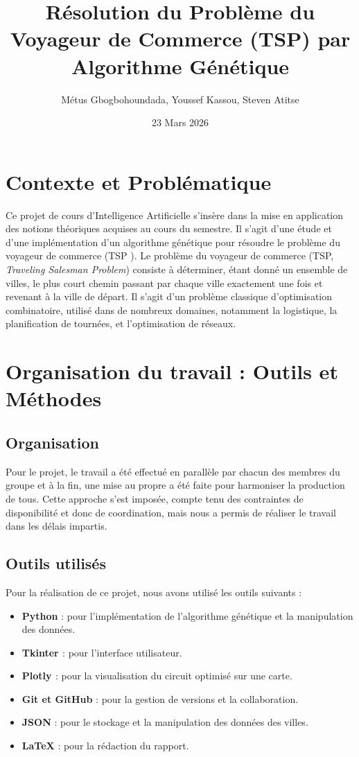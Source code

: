 \documentclass[a4paper,12pt]{article}
\title{Résolution du Problème du Voyageur de Commerce (TSP) par Algorithme Génétique}
\author{Métus Gbogbohoundada, Youssef Kassou, Steven Atitse}
\date{23 Mars 2026}
\begin{document}
\maketitle

\section{Contexte et Problématique}
Ce projet de cours d'Intelligence Artificielle s'insère dans la mise en application des notions théoriques acquises au cours du semestre. Il s'agit d'une étude et d'une implémentation d'un algorithme génétique pour résoudre le problème du voyageur de commerce (TSP \cite{wikipedia_tsp}).
Le problème du voyageur de commerce (TSP, \emph{Traveling Salesman Problem}) consiste à déterminer, étant donné un ensemble de villes, le plus court chemin passant par chaque ville exactement une fois et revenant à la ville de départ. Il s'agit d'un problème classique d'optimisation combinatoire, utilisé dans de nombreux domaines, notamment la logistique, la planification de tournées, et l'optimisation de réseaux.

\section{Organisation du travail : Outils et Méthodes}
\subsection{Organisation}
Pour le projet, le travail a été effectué en parallèle par chacun des membres du groupe et à la fin, une mise au propre a été faite pour harmoniser la production de tous.
Cette approche s'est imposée, compte tenu des contraintes de disponibilité et donc de coordination, mais nous a permis de réaliser le travail dans les délais impartis.

\subsection{Outils utilisés}
Pour la réalisation de ce projet, nous avons utilisé les outils suivants :
\begin{itemize}
    \item \textbf{Python} : pour l'implémentation de l'algorithme génétique et la manipulation des données.
    \item \textbf{Tkinter \cite{tkinter}} : pour l'interface utilisateur.
    \item \textbf{Plotly \cite{ploty}} : pour la visualisation du circuit optimisé sur une carte.
    \item \textbf{Git et GitHub} : pour la gestion de versions et la collaboration.
    \item \textbf{JSON} : pour le stockage et la manipulation des données des villes.
    \item \textbf{\LaTeX} : pour la rédaction du rapport.
\end{itemize}
\end{document}
